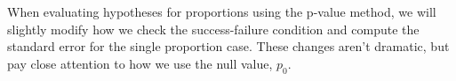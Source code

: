 
When evaluating hypotheses for proportions using the
p-value method,
we will slightly modify how we check the success-failure
condition and compute the standard error for the
single proportion case.
These changes aren't dramatic, but pay close attention
to how we use the null value, $p_0$.

